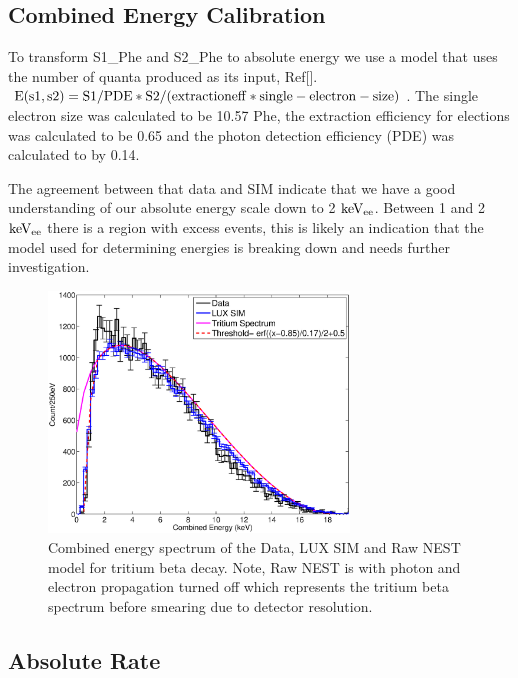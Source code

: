 \subsection{Combined Energy Calibration}

To transform S1\_Phe and S2\_Phe to absolute energy we use a model that uses the number of quanta produced as its input, Ref[]. 
$ \rm E(s1,s2) = S1/PDE * S2/(extraction eff * single-electron-size) $. The single electron size was calculated to be 10.57 Phe, the extraction efficiency for elections was calculated to be 0.65 and the photon detection efficiency (PDE) was calculated to by 0.14.


The agreement between that data and SIM indicate that we have a good understanding of our absolute energy scale down to 2 $\rm keV_{ee}$. Between 1 and 2 $\rm keV_{ee}$ there is a region with excess events, this is likely an indication that the model used for determining energies is breaking down and needs further investigation.

\begin{figure}[H]\centering
\includegraphics[width=80mm]{CH3T_E_spec_18_lux10_20130813T1120_cp05328_note.eps}
\caption{Combined energy spectrum of the Data, LUX SIM and Raw NEST model for tritium beta decay. Note, Raw NEST is with photon and electron propagation turned off which represents the tritium beta spectrum before smearing due to detector resolution.}
\label{fig:E_spec}
\end{figure}
 
 
 \subsection{Absolute Rate}
 
